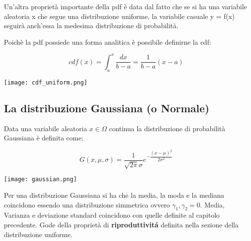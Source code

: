 \documentclass[11pt,a4paper]{book}
\begin{document}
Un'altra propriet\`{a} importante della pdf \`{e} data dal fatto che se si ha una variabile aleatoria x che segue una distribuzione uniforme, la variabile casuale y = f(x) seguir\`{a} anch'essa la medesima distribuzione di probabilit\`{a}.\newline

\noindent Poich\`{e} la pdf possiede una forma analitica \`{e} possibile definirne la cdf:



\vspace{0.3in}

  \begin{minipage}{0.5\textwidth}
  	\begin{equation*}
	cdf(x) = \int_{a}^{x}\dfrac{dx}{b-a} = \dfrac{1}{b-a}(x-a)
\end{equation*}
  \end{minipage}
  \begin{minipage}{.4\textwidth}
    \centering
    \texttt{[image: cdf\_uniform.png]}

  \end{minipage}
\vspace{0.3in}

\subsection{La distribuzione Gaussiana (o Normale)}

Data una variabile aleatoria $x \in \Omega $ continua la distribuzione di probabilit\`{a} Gaussiana \`{e} definita come:

\vspace{0.3in}

  \begin{minipage}{0.5\textwidth}
\begin{equation}
	G(x,\mu,\sigma) = \dfrac{1}{\sqrt{2\pi}\sigma} e^{-\dfrac{(x-\mu)^2}{2\sigma^2}}
\end{equation}
  \end{minipage}
  \begin{minipage}{.4\textwidth}
    \centering
    \texttt{[image: gaussian.png]}

  \end{minipage}
\vspace{0.3in}

Per una distribuzione Gaussiana si ha che la media, la moda e la mediana coincidono essendo una distribuzione simmetrica ovvero $\gamma_{1},\gamma_2 = 0$. Media, Varianza e deviazione standard coincidono con quelle definite al capitolo precedente. Gode della propriet\`{a} di \textbf{riproduttivit\'{a}} definita nella sezione della distribuzione uniforme.\newline
\end{document}
